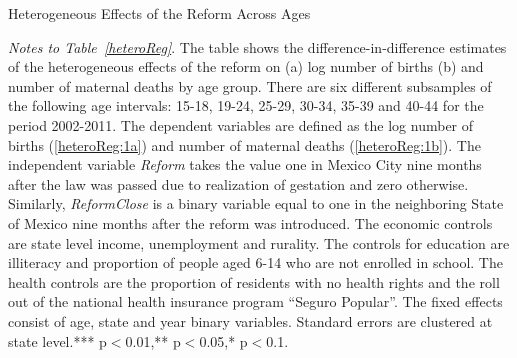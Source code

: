 \documentclass[a4paper, 11pt]{article}
\begin{document}
\begin{spacing}{1.4}
\begin{table}[H]  \caption{Heterogeneous Effects of the Reform Across Ages} \label{heteroReg}
  \begin{threeparttable}
    \begin{subtable}{1\textwidth} \label{heteroReg:1a}
      {\footnotesize  }
    \end{subtable}
    \begin{subtable}{1\textwidth}  \label{heteroReg:1b}
      {\footnotesize  }
    \end{subtable}
    \begin{tablenotes}
      \footnotesize
    \item \textit{Notes to Table~\ref{heteroReg}}. The table shows the difference-in-difference estimates of the heterogeneous effects of the reform on (a) log number of births (b) and number of maternal deaths by age group. There are six different subsamples of the following age intervals: 15-18, 19-24, 25-29, 30-34, 35-39 and 40-44 for the period 2002-2011. The dependent variables are defined as the log number of births (\ref{heteroReg:1a}) and number of maternal deaths (\ref{heteroReg:1b}). The independent variable \textit{Reform} takes the value one in Mexico City nine months after the law was passed due to realization of gestation and zero otherwise. Similarly, \textit{ReformClose} is a binary variable equal to one in the neighboring State of Mexico nine months after the reform was introduced. The economic controls are state level income, unemployment and rurality. The controls for education are illiteracy and proportion of people aged 6-14 who are not enrolled in school. The health controls are the proportion of residents with no health rights and the roll out of the national health insurance program ``Seguro Popular''. The fixed effects consist of age, state and year binary variables. Standard errors are clustered at state level.*** p$<$0.01,** p$<$0.05,* p$<$0.1.
    \end{tablenotes}
  \end{threeparttable}
\end{table}
\restoregeometry


\end{spacing}
\end{document}
